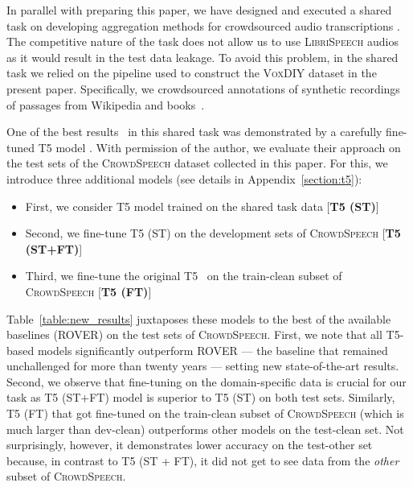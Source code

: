 \documentclass{article}
\newcommand{\libri}{\textsc{LibriSpeech}}
\newcommand{\speech}{\textsc{CrowdSpeech}}
\newcommand{\vox}{\textsc{VoxDIY}}
\begin{document}
In parallel with preparing this paper, we have designed and executed a shared task on developing aggregation methods for crowdsourced audio transcriptions \citep{VLDB2021Challenge}. The competitive nature of the task does not allow us to use \libri{} audios as it would result in the test data leakage. To avoid this problem, in the shared task we relied on the pipeline used to construct the \vox{} dataset in the present paper. Specifically, we crowdsourced annotations of synthetic recordings of passages from Wikipedia and books~\citep{soskkobayashi2018bookcorpus}.

One of the best results~\citep{pletenev21noisy} in this shared task was demonstrated by a carefully fine-tuned  T5 model \citep{JMLR:v21:20-074}. With permission of the author, we evaluate their approach on the test sets of the \speech{} dataset collected in this paper. For this, we introduce three additional models (see details in Appendix~\ref{section:t5}):

\begin{itemize}[itemsep=0pt, leftmargin=15pt, topsep=0pt]
    \item  First, we consider T5 model trained on the shared task data [\textbf{T5 (ST)}]
    \item  Second, we fine-tune T5 (ST) on the development sets of \speech{} [\textbf{T5 (ST+FT)}]
    \item  Third, we fine-tune the original T5~\citep{JMLR:v21:20-074} on the train-clean subset of \speech{} [\textbf{T5 (FT)}]
\end{itemize}

Table~\ref{table:new_results} juxtaposes these models to the best of the available baselines (ROVER) on the test sets of \speech{}. First, we note that all T5-based models significantly outperform ROVER --- the baseline that remained unchallenged for more than twenty years --- setting new state-of-the-art results. Second, we observe that fine-tuning on the domain-specific data is crucial for our task as T5 (ST+FT) model is superior to T5 (ST) on both test sets. Similarly, T5 (FT) that got fine-tuned on the train-clean subset of \speech{} (which is much larger than dev-clean)  outperforms other models on the test-clean set. Not surprisingly, however, it demonstrates lower accuracy on the test-other set because, in contrast to T5 (ST + FT), it did not get to see data from the \emph{other} subset of \speech{}.
\end{document}
